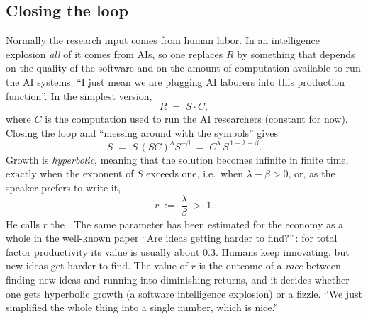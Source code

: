 \subsection{Closing the loop}\label{sec:L4-loop}
Normally the research input comes from human labor. In an intelligence explosion \emph{all} of it comes from AIs, so one replaces $R$ by something that depends on the quality of the software and on the amount of computation available to run the AI systems: ``I just mean we are plugging AI laborers into this production function''. In the simplest version,
\begin{equation}\label{eq:L4-RSC}
   R\;=\;S\cdot C ,
\end{equation}
where $C$ is the computation used to run the AI researchers (constant for now). Closing the loop and ``messing around with the symbols'' gives
\begin{equation}\label{eq:L4-closed}
   \dot S\;=\;S\,(SC)^{\lambda}S^{-\beta}\;=\;C^{\lambda}\,S^{\,1+\lambda-\beta}.
\end{equation}
Growth is \emph{hyperbolic}, meaning that the solution becomes infinite in finite time, exactly when the exponent of $S$ exceeds one, i.e.\ when $\lambda-\beta>0$, or, as the speaker prefers to write it,
\begin{equation}\label{eq:L4-r}
   r\;:=\;\frac{\lambda}{\beta}\;>\;1 .
\end{equation}
He calls $r$ the . The same parameter has been estimated for the economy as a whole in the well-known paper ``Are ideas getting harder to find?''\,\citep{bloom2020}: for total factor productivity its value is usually about $0.3$. Humans keep innovating, but new ideas get harder to find. The value of $r$ is the outcome of a \emph{race} between finding new ideas and running into diminishing returns, and it decides whether one gets hyperbolic growth (a software intelligence explosion) or a fizzle. ``We just simplified the whole thing into a single number, which is nice.''

